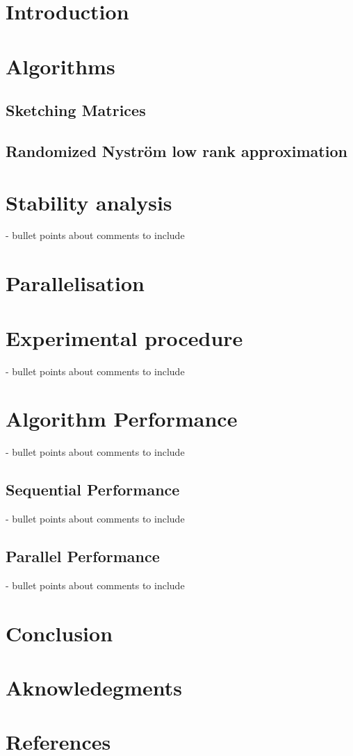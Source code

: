 \documentclass[a4paper, 12pt,oneside]{article}
\begin{document}
 
	 
	\clearpage
	\tableofcontents
	\thispagestyle{empty}
	\clearpage
	\setcounter{page}{1}

	\section{Introduction}
	\section{Algorithms}
        \subsection{Sketching Matrices}
        \subsection{Randomized Nyström low rank approximation}
	\section{Stability analysis}
		- bullet points about comments to include 
	\section{Parallelisation}
	\section{Experimental procedure}
		- bullet points about comments to include 
	\section{Algorithm Performance}
		- bullet points about comments to include 
        \subsection{Sequential Performance}
			- bullet points about comments to include 
        \subsection{Parallel Performance}
			- bullet points about comments to include 
	\section{Conclusion}
	\section*{Aknowledegments}
	\section*{References}
\end{document}
